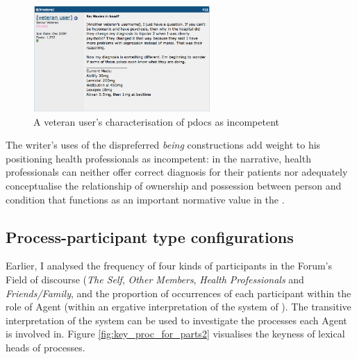 
\begin{figure}[H]
  \begin{center}
  \includegraphics[width=0.6\textwidth]{../images/incomppdocs.png}
  \end{center}
  \caption{A veteran user's characterisation of pdocs as incompetent}
  \label{fig:incomppdocs}
  \end{figure}
%
\noindent The writer's uses of the dispreferred \emph{being} constructions add weight to his positioning health professionals as incompetent: in the narrative, health professionals can neither offer correct diagnosis for their patients nor adequately conceptualise the relationship of ownership and possession between person and condition that functions as an important normative value in the .

\subsection{Process-participant type configurations}

Earlier, I analysed the frequency of four kinds of participants in the Forum's Field of discourse (\emph{The Self}, \emph{Other Members}, \emph{Health Professionals} and \emph{Friends\slash Family}, and the proportion of occurrences of each participant within the role of Agent (within an ergative interpretation of the system of ). The transitive interpretation of the system can be used to investigate the processes each Agent is involved in. Figure \ref{fig:key_proc_for_parts2} visualises the keyness of lexical heads of processes.

